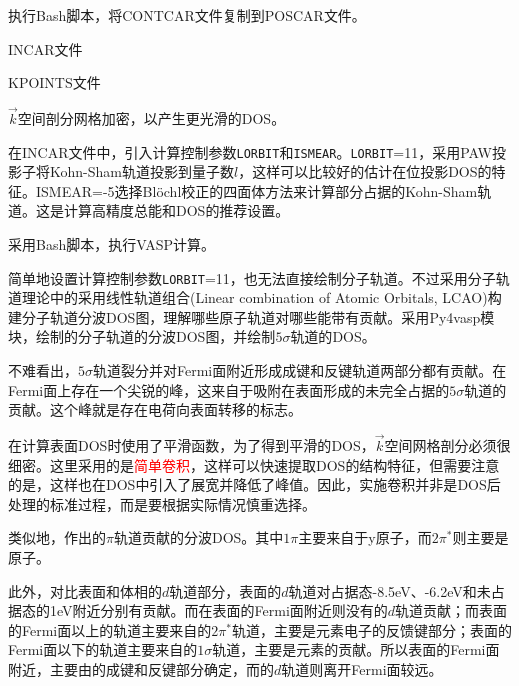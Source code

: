 执行\textrm{Bash}脚本，将\textrm{CONTCAR}文件复制到\textrm{POSCAR}文件。

\textrm{INCAR}文件

\textrm{KPOINTS}文件


$\vec k$空间剖分网格加密，以产生更光滑的\textrm{DOS}。

在\textrm{INCAR}文件中，引入计算控制参数\texttt{LORBIT}和\texttt{ISMEAR}。\texttt{LORBIT}=11，采用\textrm{PAW}投影子将\textrm{Kohn-Sham}轨道投影到量子数$l$，这样可以比较好的估计在位投影\textrm{DOS}的特征。\textrm{ISMEAR}=-5选择\textrm{Bl\"ochl}校正的四面体方法来计算部分占据的\textrm{Kohn-Sham}轨道。这是计算高精度总能和\textrm{DOS}的推荐设置。

采用\textrm{Bash}脚本，执行\textrm{VASP}计算。

简单地设置计算控制参数\texttt{LORBIT}=11，也无法直接绘制分子轨道。不过采用分子轨道理论中的采用线性轨道组合\textrm{(Linear combination of Atomic Orbitals, LCAO)}构建分子轨道分波\textrm{DOS}图，理解哪些原子轨道对哪些能带有贡献。采用\textrm{Py4vasp}模块，绘制的分子轨道的分波\textrm{DOS}图，并绘制$5\sigma$轨道的\textrm{DOS}。

不难看出，$5\sigma$轨道裂分并对\textrm{Fermi}面附近形成成键和反键轨道两部分都有贡献。在\textrm{Fermi}面上存在一个尖锐的峰，这来自于吸附在表面形成的未完全占据的$5\sigma$轨道的贡献。这个峰就是存在电荷向表面转移的标志。

在计算表面\textrm{DOS}时使用了平滑函数，为了得到平滑的\textrm{DOS}，$\vec k$空间网格剖分必须很细密。这里采用的是\textcolor{red}{简单卷积}，这样可以快速提取\textrm{DOS}的结构特征，但需要注意的是，这样也在\textrm{DOS}中引入了展宽并降低了峰值。因此，实施卷积并非是\textrm{DOS}后处理的标准过程，而是要根据实际情况慎重选择。

类似地，作出的$\pi$轨道贡献的分波\textrm{DOS}。其中$1\pi$主要来自于y原子，而$2\pi^{\ast}$则主要是原子。

此外，对比表面和体相的$d$轨道部分，表面的$d$轨道对占据态\textrm{-8.5eV}、\textrm{-6.2eV}和未占据态的\textrm{1eV}附近分别有贡献。而在表面的\textrm{Fermi}面附近则没有的$d$轨道贡献；而表面的\textrm{Fermi}面以上的轨道主要来自的$2\pi^{\ast}$轨道，主要是元素电子的反馈键部分；表面的\textrm{Fermi}面以下的轨道主要来自的$1\sigma$轨道，主要是元素的贡献。所以表面的\textrm{Fermi}面附近，主要由的成键和反键部分确定，而的$d$轨道则离开\textrm{Fermi}面较远。

